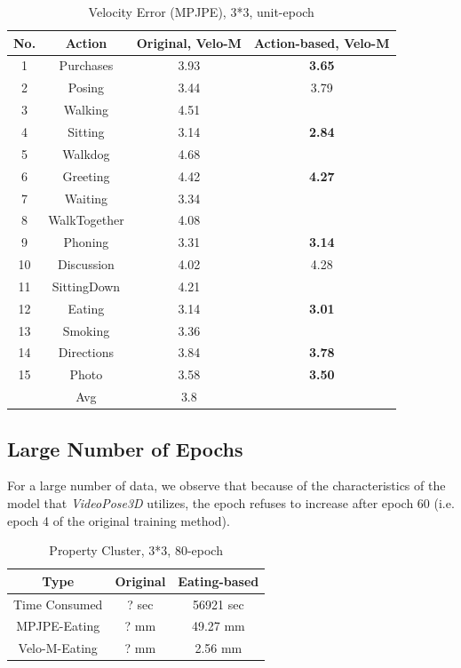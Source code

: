 \documentclass[10pt,twocolumn,letterpaper]{article}
\begin{document}
\begin{table}[H]
\caption{Velocity Error (MPJPE), 3*3, unit-epoch}


\begin{tabular}{cccc}
\hline
No. & Action & Original, Velo-M  & Action-based, Velo-M\\
\hline

1&Purchases& 3.93 & \textbf{3.65} \\
2&Posing& 3.44 & 3.79 \\
3&Walking& 4.51 \\
4&Sitting& 3.14 & \textbf{2.84} \\
5&Walkdog& 4.68 & \\
6&Greeting& 4.42 & \textbf{4.27}\\
7&Waiting& 3.34 & \\
8&WalkTogether& 4.08 & \\
9&Phoning& 3.31 & \textbf{3.14} \\
10&Discussion& 4.02 & 4.28 \\
11&SittingDown& 4.21 & \\
12&Eating& 3.14 & \textbf{3.01} \\
13&Smoking& 3.36 & \\
14&Directions& 3.84 & \textbf{3.78}\\
15&Photo& 3.58 & \textbf{3.50}\\
&Avg& 3.8 &\\

\hline
\end{tabular}
\end{table}


\subsection{Large Number of Epochs}

For a large number of data, we observe that because of the characteristics of the model that \textit{VideoPose3D}
utilizes, the epoch refuses to increase after epoch 60 (i.e. epoch 4 of the original training method).


\begin{table}[H]
\caption{Property Cluster, 3*3, 80-epoch}
\centering
\begin{tabular}{ccc}
\hline
Type & Original  & Eating-based\\
\hline

Time Consumed&  ? sec & 56921 sec\\
MPJPE-Eating&  ? mm & 49.27 mm\\
Velo-M-Eating&  ? mm & 2.56 mm  \\

\hline
\end{tabular}
\end{table}
\end{document}
